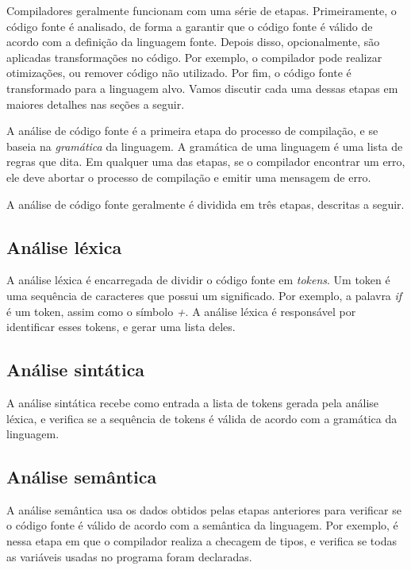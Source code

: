 Compiladores geralmente funcionam com uma série de etapas. Primeiramente, o
código fonte é analisado, de forma a garantir que o código fonte é válido de
acordo com a definição da linguagem fonte. Depois disso, opcionalmente, são
aplicadas transformações no código. Por exemplo, o compilador pode realizar
otimizações, ou remover código não utilizado. Por fim, o código fonte é
transformado para a linguagem alvo. Vamos discutir cada uma dessas etapas em
maiores detalhes nas seções a seguir.

A análise de código fonte é a primeira etapa do processo de compilação, e se
baseia na \textit{gramática} da linguagem. A gramática de uma linguagem é uma lista
de regras que dita. Em qualquer uma das etapas, se o compilador encontrar um erro,
ele deve abortar o processo de compilação e emitir uma mensagem de erro.

A análise de código fonte geralmente é dividida em três etapas, descritas a seguir.

\subsection{Análise léxica}

A análise léxica é encarregada de dividir o código fonte em \textit{tokens}. Um
token é uma sequência de caracteres que possui um significado. Por exemplo, a
palavra \textit{if} é um token, assim como o símbolo \textit{+}. A análise léxica
é responsável por identificar esses tokens, e gerar uma lista deles.


\subsection{Análise sintática}

A análise sintática recebe como entrada a lista de tokens gerada pela análise
léxica, e verifica se a sequência de tokens é válida de acordo com a gramática da
linguagem.

\subsection{Análise semântica}

A análise semântica usa os dados obtidos pelas etapas anteriores para verificar se
o código fonte é válido de acordo com a semântica da linguagem. Por exemplo, é
nessa etapa em que o compilador realiza a checagem de tipos, e verifica se todas
as variáveis usadas no programa foram declaradas.



